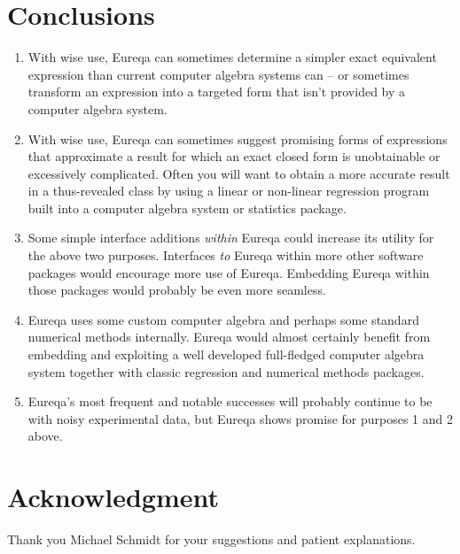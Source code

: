\documentclass[12pt,english]{article}
\begin{document}
\section{Conclusions}
\begin{enumerate}
\item With wise use, Eureqa can sometimes determine a simpler exact equivalent
expression than current computer algebra systems can -- or sometimes
transform an expression into a targeted form that isn't provided by
a computer algebra system.\vspace{-5pt}

\item With wise use, Eureqa can sometimes suggest promising forms of expressions
that approximate a result for which an exact closed form is unobtainable
or excessively complicated. Often you will want to obtain a more accurate
result in a thus-revealed class by using a linear or non-linear regression
program built into a computer algebra system or statistics package.\vspace{-5pt}

\item Some simple interface additions \textsl{within} Eureqa could increase
its utility for the above two purposes. Interfaces \textsl{to} Eureqa
within more other software packages would encourage more use of Eureqa.
Embedding Eureqa within those packages would probably be even more
seamless.\vspace{-5pt}

\item Eureqa uses some custom computer algebra and perhaps some standard
numerical methods internally. Eureqa would almost certainly benefit
from embedding and exploiting a well developed full-fledged computer
algebra system together with classic regression and numerical methods
packages.\vspace{-5pt}

\item Eureqa's most frequent and notable successes will probably continue
to be with noisy experimental data, but Eureqa shows promise for purposes
1 and 2 above.\vspace{-5pt}

\end{enumerate}

\section*{Acknowledgment}

Thank you Michael Schmidt for your suggestions and patient explanations.
\end{document}
